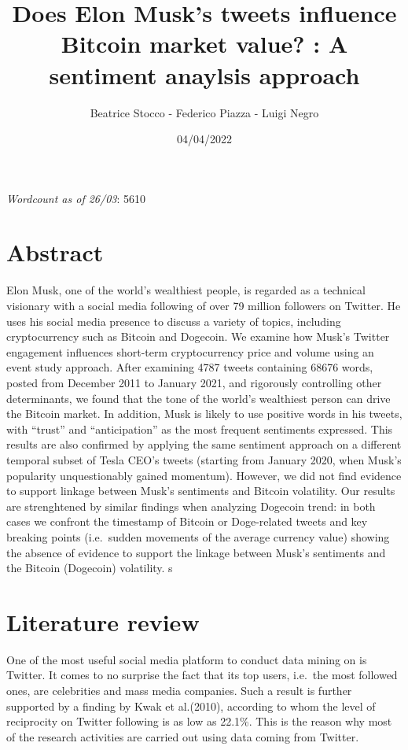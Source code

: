 \documentclass[
]{article}
\title{Does Elon Musk's tweets influence Bitcoin market value? : A
sentiment anaylsis approach}
\author{Beatrice Stocco - Federico Piazza - Luigi Negro}
\date{04/04/2022}
\begin{document}
\maketitle

\emph{Wordcount as of 26/03}: 5610

\hypertarget{abstract}{%
\section{Abstract}\label{abstract}}

\autocite{abdiMarketImpactGovernmentb} Elon Musk, one of the world's
wealthiest people, is regarded as a technical visionary with a social
media following of over 79 million followers on Twitter. He uses his
social media presence to discuss a variety of topics, including
cryptocurrency such as Bitcoin and Dogecoin. We examine how Musk's
Twitter engagement influences short-term cryptocurrency price and volume
using an event study approach. After examining 4787 tweets containing
68676 words, posted from December 2011 to January 2021, and rigorously
controlling other determinants, we found that the tone of the world's
wealthiest person can drive the Bitcoin market. In addition, Musk is
likely to use positive words in his tweets, with ``trust'' and
``anticipation'' as the most frequent sentiments expressed. This results
are also confirmed by applying the same sentiment approach on a
different temporal subset of Tesla CEO's tweets (starting from January
2020, when Musk's popularity unquestionably gained momentum). However,
we did not find evidence to support linkage between Musk's sentiments
and Bitcoin volatility. Our results are strenghtened by similar findings
when analyzing Dogecoin trend: in both cases we confront the timestamp
of Bitcoin or Doge-related tweets and key breaking points (i.e.~sudden
movements of the average currency value) showing the absence of evidence
to support the linkage between Musk's sentiments and the Bitcoin
(Dogecoin) volatility. s

\hypertarget{literature-review}{%
\section{Literature review}\label{literature-review}}

One of the most useful social media platform to conduct data mining on
is Twitter. It comes to no surprise the fact that its top users,
i.e.~the most followed ones, are celebrities and mass media companies.
Such a result is further supported by a finding by Kwak et al.(2010),
according to whom the level of reciprocity on Twitter following is as
low as 22.1\%. This is the reason why most of the research activities
are carried out using data coming from Twitter.
\end{document}
